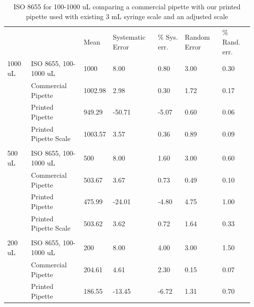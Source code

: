 \documentclass[10pt,letterpaper]{article}
\begin{document}
\begin{table}[!ht]
\begin{adjustwidth}{-2.25in}{0in} %
\centering
\caption{ISO 8655 for 100-1000 uL comparing a commercial pipette with our printed pipette used with existing 3 mL syringe scale and an adjusted scale}
\label{table3}
\begin{tabular}{lllllll}
        &                       & Mean   & Systematic Error & \% Sys. err. & Random Error & \% Rand. err. \\
1000 uL & ISO 8655, 100-1000 uL & 1000    & 8.00             & 0.80         & 3.00         & 0.30          \\
        & Commercial Pipette    & 1002.98 & 2.98             & 0.30         & 1.72         & 0.17          \\
        & Printed Pipette       & 949.29  & -50.71           & -5.07        & 0.60         & 0.06          \\
        & Printed Pipette Scale & 1003.57 & 3.57             & 0.36         & 0.89         & 0.09          \\
        &                       &         &                  &              &              &               \\
500 uL  & ISO 8655, 100-1000 uL & 500     & 8.00             & 1.60         & 3.00         & 0.60          \\
        & Commercial Pipette    & 503.67  & 3.67             & 0.73         & 0.49         & 0.10          \\
        & Printed Pipette       & 475.99  & -24.01           & -4.80        & 4.75         & 1.00          \\
        & Printed Pipette Scale & 503.62  & 3.62             & 0.72         & 1.64         & 0.33          \\
        &                       &         &                  &              &              &               \\
200 uL  & ISO 8655, 100-1000 uL & 200     & 8.00             & 4.00         & 3.00         & 1.50          \\
        & Commercial Pipette    & 204.61  & 4.61             & 2.30         & 0.15         & 0.07          \\
        & Printed Pipette       & 186.55  & -13.45           & -6.72        & 1.31         & 0.70          \\

\end{tabular}
\end{adjustwidth}
\end{table}
\end{document}
